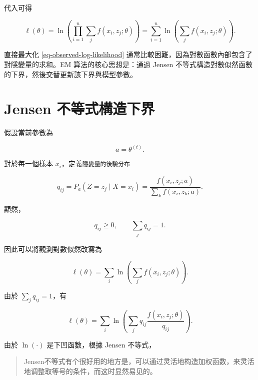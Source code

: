代入可得

\begin{equation}\label{eq-observed-log-likelihood}
\ell(\theta)
=
\ln\left(
\prod_{i=1}^{n}
\sum_j f(x_i,z_j;\theta)
\right)
=
\sum_{i=1}^{n}
\ln\left(
\sum_j f(x_i,z_j;\theta)
\right).
\end{equation}

直接最大化 \eqref{eq-observed-log-likelihood} 通常比較困難，因為對數函數內部包含了對隱變量的求和。EM 算法的核心思想是：通過 Jensen 不等式構造對數似然函數的下界，然後交替更新該下界與模型參數。

\section{Jensen 不等式構造下界}

假設當前參數為

\begin{equation}\label{eq-current-theta}
a = \theta^{(t)}.
\end{equation}

對於每一個樣本 \(x_i\)，定義\verb|隱變量的後驗分布|

\begin{equation}\label{eq-posterior-q}
q_{ij}
=
P_a(Z=z_j \mid X=x_i)
=
\frac{
f(x_i,z_j;a)
}{
\sum_k f(x_i,z_k;a)
}.
\end{equation}

顯然，

\begin{equation}\label{eq-q-condition}
q_{ij}\ge 0,
\qquad
\sum_j q_{ij}=1.
\end{equation}

因此可以將觀測對數似然改寫為

\begin{equation}\label{eq-ll-original}
\ell(\theta)
=
\sum_i
\ln\left(
\sum_j f(x_i,z_j;\theta)
\right).
\end{equation}

由於 \(\sum_j q_{ij}=1\)，有

\begin{equation}\label{eq-ll-with-q}
\ell(\theta)
=
\sum_i
\ln\left(
\sum_j
q_{ij}
\frac{
f(x_i,z_j;\theta)
}{
q_{ij}
}
\right).
\end{equation}

由於 \(\ln(\cdot)\) 是下凹函數，根據 Jensen 不等式，

\begin{quote}
Jensen不等式有个很好用的地方是，可以通过灵活地构造加权函数，来灵活地调整取等号的条件，而这时显然易见的。
\end{quote}

